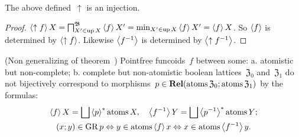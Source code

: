 \begin{prop}
The above defined~$\uparrow$ is an injection.
\end{prop}

\begin{proof}
$\left\langle \uparrow f\right\rangle X = \bigsqcap^{\mathfrak{B}}_{X'\in\operatorname{up} X} \left\langle f\right\rangle X' = \min_{X'\in\operatorname{up} X} \left\langle f\right\rangle X' = \left\langle f\right\rangle X$.
So $\left\langle f\right\rangle$ is determined by $\left\langle \uparrow f\right\rangle$. Likewise $\left\langle f^{-1}\right\rangle$ is determined by $\left\langle \uparrow f^{-1}\right\rangle$.
\end{proof}

\begin{conjecture}
(Non generalizing of theorem~)
Pointfree funcoids~$f$ between some: a. atomistic but non-complete; b. complete but non-atomistic boolean lattices~$\mathfrak{Z}_0$ and~$\mathfrak{Z}_1$
do not bijectively correspond to morphisms~$p\in\mathbf{Rel}(\operatorname{atoms}\mathfrak{Z}_0;\operatorname{atoms}\mathfrak{Z}_1)$ by the formulas:
\begin{gather*}
\left\langle f\right\rangle X = \bigsqcup\left\langle p\right\rangle ^{\ast}\operatorname{atoms} X, \quad
\left\langle f^{-1}\right\rangle Y = \bigsqcup\left\langle p^{-1}\right\rangle ^{\ast}\operatorname{atoms} Y; \\
(x;y)\in\operatorname{GR} p \Leftrightarrow y\in\operatorname{atoms}\left\langle f\right\rangle x \Leftrightarrow x\in\operatorname{atoms}\left\langle f^{-1}\right\rangle y.
\end{gather*}
\end{conjecture}
